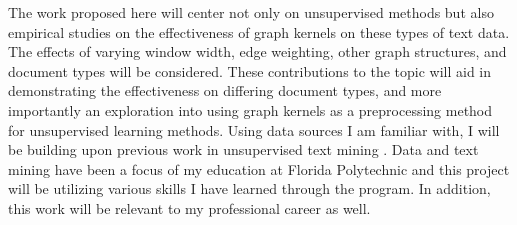 The work proposed here will center not only on unsupervised methods but also empirical studies on the effectiveness of graph kernels on these types of text data. The effects of varying window width, edge weighting, other graph structures, and document types will be considered. These contributions to the topic will aid in demonstrating the effectiveness on differing document types, and more importantly an exploration into using graph kernels as a preprocessing method for unsupervised learning methods. Using data sources I am familiar with, I will be building upon previous work in unsupervised text mining \cite{akioyamen2020framework}. Data and text mining have been a focus of my education at Florida Polytechnic and this project will be utilizing various skills I have learned through the program. In addition, this work will be relevant to my professional career as well.







